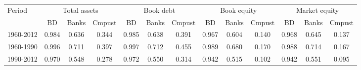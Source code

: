 \begin{tabular}{lcccccccccccc}
\hline\hline
Period & \multicolumn{3}{c}{Total assets} & \multicolumn{3}{c}{Book debt} & \multicolumn{3}{c}{Book equity} & \multicolumn{3}{c}{Market equity} \\
 & BD & Banks & Cmpust & BD & Banks & Cmpust & BD & Banks & Cmpust & BD & Banks & Cmpust \\
\hline
1960-2012 & 0.984 & 0.636 & 0.344 & 0.985 & 0.638 & 0.391 & 0.967 & 0.604 & 0.140 & 0.968 & 0.645 & 0.137 \\
1960-1990 & 0.996 & 0.711 & 0.397 & 0.997 & 0.712 & 0.455 & 0.989 & 0.680 & 0.170 & 0.988 & 0.714 & 0.167 \\
1990-2012 & 0.970 & 0.548 & 0.278 & 0.972 & 0.550 & 0.314 & 0.942 & 0.515 & 0.102 & 0.942 & 0.551 & 0.095 \\
\hline\hline
\end{tabular}

